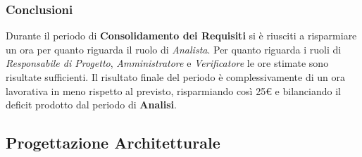 		\subsubsection{Conclusioni}
		Durante il periodo di \textbf{Consolidamento dei Requisiti} si è riusciti a risparmiare un ora per quanto riguarda il ruolo di \textit{Analista}. Per quanto riguarda i ruoli di \textit{Responsabile di Progetto}, \textit{Amministratore} e \textit{Verificatore} le ore stimate sono risultate sufficienti. Il risultato finale del periodo è complessivamente di un ora lavorativa in meno rispetto al previsto, risparmiando così 25€ e bilanciando il deficit prodotto dal periodo di \textbf{Analisi}.
	\subsection{Progettazione Architetturale}
